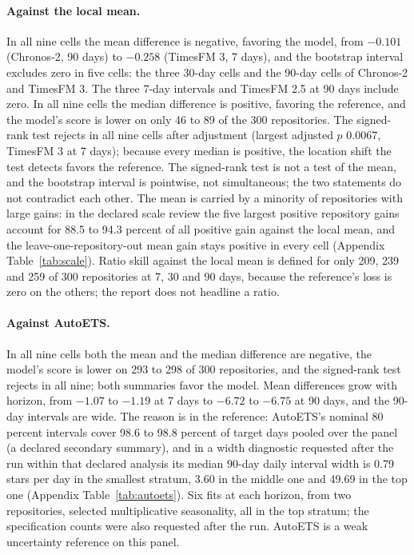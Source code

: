 \paragraph{Against the local mean.} In all nine cells the mean difference is negative, favoring the model,
from $-0.101$ (Chronos-2, 90 days) to $-0.258$ (TimesFM 3, 7 days), and the bootstrap interval excludes
zero in five cells: the three 30-day cells and the 90-day cells of Chronos-2 and TimesFM 3. The three 7-day
intervals and TimesFM 2.5 at 90 days include zero. In all nine cells the median difference is positive,
favoring the reference, and the model's score is lower on only 46 to 89 of the 300 repositories. The
signed-rank test rejects in all nine cells after adjustment (largest adjusted $p$ 0.0067, TimesFM 3 at 7
days); because every median is positive, the location shift the test detects favors the reference. The
signed-rank test is not a test of the mean, and the bootstrap interval is pointwise, not simultaneous; the
two statements do not contradict each other. The mean is carried by a minority of repositories with large
gains: in the declared scale review the five largest positive repository gains account for 88.5 to 94.3
percent of all positive gain against the local mean, and the leave-one-repository-out mean gain stays
positive in every cell (Appendix Table~\ref{tab:scale}). Ratio skill against the local mean is defined for
only 209, 239 and 259 of 300 repositories at 7, 30 and 90 days, because the reference's loss is zero on the
others; the report does not headline a ratio.

\paragraph{Against AutoETS.} In all nine cells both the mean and the median difference are negative, the
model's score is lower on 293 to 298 of 300 repositories, and the signed-rank test rejects in all nine; both
summaries favor the model. Mean differences grow with horizon, from $-1.07$ to $-1.19$ at 7 days to $-6.72$
to $-6.75$ at 90 days, and the 90-day intervals are wide. The reason is in the reference: AutoETS's nominal
80 percent intervals cover 98.6 to 98.8 percent of target days pooled over the panel (a declared secondary
summary), and in a width diagnostic requested after the run within that declared analysis its median 90-day
daily interval width is 0.79 stars per day in the smallest stratum, 3.60 in the middle one and 49.69 in the
top one (Appendix Table~\ref{tab:autoets}). Six fits at each horizon, from two repositories, selected
multiplicative seasonality, all in the top stratum; the specification counts were also requested after the
run. AutoETS is a weak uncertainty reference on this panel.

